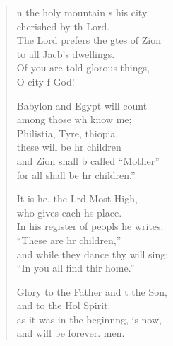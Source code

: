 \begin{verse}
  \begin{patverse}
n the holy mountain \pointup{\i}s his city\Med\\
cherished by th Lord.\\
The Lord prefers the gtes of Zion\Med\\
to all Jacb’s dwellings.\\
Of you are told glor\pointup{\i}ous things,\Med\\
O city f God!

Babylon and Egypt  will count\Med\\
among those wh know me;\\
Philistia, Tyre, thiopia,\Med\\
these will be hr children\\
and Zion shall b called “Mother”\Med\\
for all shall be hr children.”

It is he, the Lrd Most High,\Med\\
who gives each h\pointup{\i}s place.\\
In his register of peopls he writes:\Med\\
“These are hr children,”\\
and while they dance thy will sing:\Med\\
“In you all find thir home.”

Glory to the Father and t the Son,\Med\\
and to the Hol Spirit:\\
as it was in the beginn\pointup{\i}ng, is now,\Med\\
and will be forever. men.
  \end{patverse}
\end{verse}
